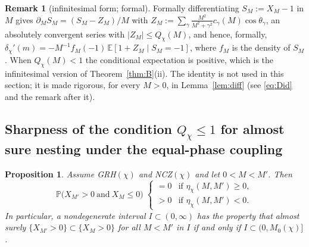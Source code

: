 \documentclass[11pt]{amsart}
\newtheorem{proposition}[theorem]{Proposition}
\theoremstyle{definition}
\newtheorem{remark}[theorem]{Remark}
\numberwithin{equation}{section}
\newcommand{\PP}{\mathbb P}
\newcommand{\EE}{\mathbb E}
\begin{document}
\begin{remark}[infinitesimal form; formal]\label{rem:infinitesimal}
Formally differentiating $S_M:=X_M-1$ in $M$ gives
$\partial_MS_M=(S_M-Z_M)/M$ with
$Z_M:=\sum_\gamma\frac{M^2}{M^2+\gamma^2}c_\gamma(M)\cos\theta_\gamma$,
an absolutely convergent series with $|Z_M|\le Q_\chi(M)$, and hence,
formally, $\delta_\chi'(m)=-M^{-1}f_M(-1)\,\EE[1+Z_M\mid S_M=-1]$,
where $f_M$ is the density of $S_M$. When $Q_\chi(M)<1$ the
conditional expectation is positive, which is the infinitesimal
version of Theorem~\ref{thm:B}(ii). The identity is not used in this
section; it is made rigorous, for every $M>0$, in
Lemma~\ref{lem:diff} (see \eqref{eq:Did} and the remark after it).
\end{remark}

\subsection{Sharpness of the condition \texorpdfstring{$Q_\chi\le1$}{Q<=1}
for almost sure nesting under the equal-phase coupling}

\begin{proposition}\label{prop:sharpB}
Assume GRH$(\chi)$ and NCZ$(\chi)$ and let $0<M<M'$. Then
\[
\PP\bigl(X_{M'}>0\ \text{and}\ X_M\le0\bigr)
\;\begin{cases}=0&\text{if }\eta_\chi(M,M')\ge0,\\[2pt]
>0&\text{if }\eta_\chi(M,M')<0.\end{cases}
\]
In particular, a nondegenerate interval $I\subset(0,\infty)$ has the
property that
almost surely $\{X_{M'}>0\}\subset\{X_M>0\}$ for all $M<M'$ in $I$ if
and only if $I\subset(0,M_0(\chi)]$.
\end{proposition}
\end{document}
